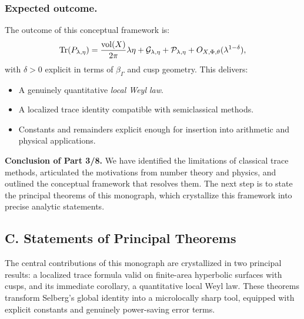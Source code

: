 \subsubsection*{Expected outcome.}
The outcome of this conceptual framework is:
\[
  \operatorname{Tr}(P_{\lambda,\eta})
  = \frac{\operatorname{vol}(X)}{2\pi}\lambda\eta
    + \mathcal{G}_{\lambda,\eta}
    + \mathcal{P}_{\lambda,\eta}
    + O_{X,\Phi,\theta}(\lambda^{1-\delta}),
\]
with $\delta>0$ explicit in terms of $\beta_\Gamma$ and cusp geometry.
This delivers:
\begin{itemize}
  \item A genuinely quantitative \emph{local Weyl law}.
  \item A localized trace identity compatible with semiclassical methods.
  \item Constants and remainders explicit enough for insertion into arithmetic and
  physical applications.
\end{itemize}

\medskip

\noindent\textbf{Conclusion of Part 3/8.}
We have identified the limitations of classical trace methods, articulated the
motivations from number theory and physics, and outlined the conceptual framework
that resolves them. The next step is to state the principal theorems of this
monograph, which crystallize this framework into precise analytic statements.


\subsection*{C. Statements of Principal Theorems}
\label{sub:intro-mainthms}

The central contributions of this monograph are crystallized in two principal results:
a localized trace formula valid on finite-area hyperbolic surfaces with cusps,
and its immediate corollary, a quantitative local Weyl law.
These theorems transform Selberg’s global identity into a microlocally sharp tool,
equipped with explicit constants and genuinely power-saving error terms.

